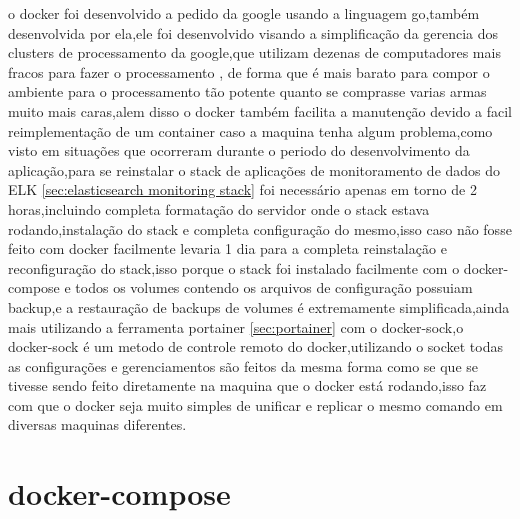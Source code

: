 \documentclass[
	12pt,				%
	openright,			%
	oneside,			%
	a4paper,			%
	english,			%
	french,				%
	spanish,			%
	brazil,				%
	]{abntex2}
\begin{document}
o docker foi desenvolvido a pedido da google usando a linguagem go,também desenvolvida por ela,ele foi desenvolvido visando a simplificação da gerencia dos clusters de processamento da google,que utilizam dezenas de computadores mais fracos para fazer o processamento , de forma que é mais barato para compor o ambiente para o processamento tão potente quanto se comprasse varias armas muito mais caras,alem disso o docker também facilita a manutenção devido a facil reimplementação de um container caso a maquina tenha algum problema,como visto em situações que ocorreram durante o periodo do desenvolvimento da aplicação,para se reinstalar o stack de aplicações de monitoramento de dados do ELK \autoref{sec:elasticsearch monitoring stack} foi necessário apenas em torno de 2 horas,incluindo completa formatação do servidor onde o stack estava rodando,instalação do stack e completa configuração do mesmo,isso caso não fosse feito com docker facilmente levaria 1 dia para a completa reinstalação e reconfiguração do stack,isso porque o stack foi instalado facilmente com o docker-compose e todos os volumes contendo os arquivos de configuração possuiam backup,e a restauração de backups de volumes é extremamente simplificada,ainda mais utilizando a ferramenta portainer \autoref{sec:portainer} com o docker-sock,o docker-sock é um metodo de controle remoto do docker,utilizando o socket todas as configurações e gerenciamentos são feitos da mesma forma como se que se tivesse sendo feito diretamente na maquina que o docker está rodando,isso faz com que o docker seja muito simples de unificar e replicar o mesmo comando em diversas maquinas diferentes.


\section{docker-compose}
\label{sec:docker-compose}
\end{document}
